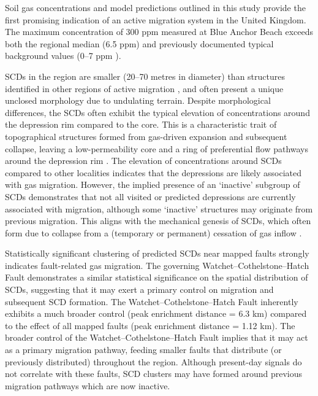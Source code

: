 \documentclass[12pt]{article}
\begin{document}
Soil gas  concentrations and model predictions outlined in this study provide the first promising indication of an active  migration system in the United Kingdom. The maximum concentration of 300 ppm measured at Blue Anchor Beach exceeds both the regional median (6.5 ppm) and previously documented typical background values (0--7 ppm \cite{h2_bg}). 

SCDs in the region are smaller (20--70 metres in diameter) than structures identified in other regions of active  migration \cite{Brazil, Russia, Australia, zgonnik}, and often present a unique unclosed morphology due to undulating terrain. Despite morphological differences, the SCDs often exhibit the typical elevation of  concentrations around the depression rim compared to the core. This is a characteristic trait of topographical structures formed from gas-driven expansion and subsequent collapse, leaving a low-permeability core and a ring of preferential flow pathways around the depression rim \cite{SCD1, Brazil, Russia, zgonnik}. The elevation of  concentrations around SCDs compared to other localities indicates that the depressions are likely associated with gas migration. However, the implied presence of an `inactive' subgroup of SCDs demonstrates that not all visited or predicted depressions are currently associated with  migration, although some `inactive' structures may originate from previous  migration. This aligns with the mechanical genesis of SCDs, which often form due to collapse from a (temporary or permanent) cessation of gas inflow \cite{SCD1}.

Statistically significant clustering of predicted SCDs near mapped faults strongly indicates fault-related gas migration. The governing Watchet--Cothelstone--Hatch Fault demonstrates a similar statistical significance on the spatial distribution of SCDs, suggesting that it may exert a primary control on  migration and subsequent SCD formation. The Watchet--Cothelstone--Hatch Fault inherently exhibits a much broader control (peak enrichment distance = 6.3 km) compared to the effect of all mapped faults (peak enrichment distance = 1.12 km). The broader control of the Watchet--Cothelstone--Hatch Fault implies that it may act as a primary migration pathway, feeding smaller faults that distribute (or previously distributed)  throughout the region. Although present-day  signals do not correlate with these faults, SCD clusters may have formed around previous migration pathways which are now inactive.
\end{document}
